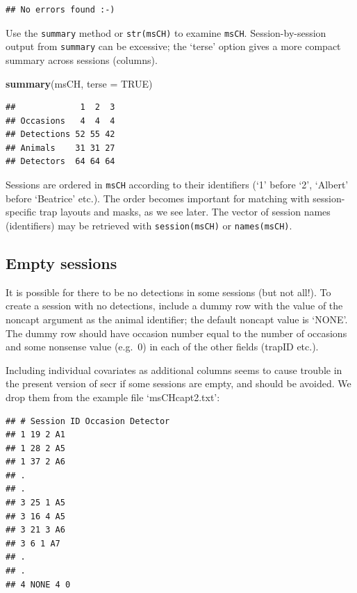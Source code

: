 \documentclass[
]{book}
\newenvironment{Shaded}{\begin{snugshade}}{\end{snugshade}}
\newcommand{\AttributeTok}[1]{\textcolor[rgb]{0.13,0.29,0.53}{#1}}
\newcommand{\ConstantTok}[1]{\textcolor[rgb]{0.56,0.35,0.01}{#1}}
\newcommand{\FunctionTok}[1]{\textcolor[rgb]{0.13,0.29,0.53}{\textbf{#1}}}
\newcommand{\NormalTok}[1]{#1}
\begin{document}
\begin{verbatim}
## No errors found :-)
\end{verbatim}

Use the \texttt{summary} method or \texttt{str(msCH)} to examine \texttt{msCH}. Session-by-session output from \texttt{summary} can be excessive; the `terse' option gives a more compact summary across sessions (columns).

\begin{Shaded}
\begin{Highlighting}[]
\FunctionTok{summary}\NormalTok{(msCH, }\AttributeTok{terse =} \ConstantTok{TRUE}\NormalTok{)}
\end{Highlighting}
\end{Shaded}

\begin{verbatim}
##             1  2  3
## Occasions   4  4  4
## Detections 52 55 42
## Animals    31 31 27
## Detectors  64 64 64
\end{verbatim}

Sessions are ordered in \texttt{msCH} according to their identifiers (`1' before `2', `Albert' before `Beatrice' etc.). The order becomes important for matching with session-specific trap layouts and masks, as we see later. The vector of session names (identifiers) may be retrieved with \texttt{session(msCH)} or \texttt{names(msCH)}.

\subsection{Empty sessions}\label{empty-sessions}

It is possible for there to be no detections in some sessions (but not all!). To create a session with no detections, include a dummy row with the value of the noncapt argument as the animal identifier; the default noncapt value is `NONE'. The dummy row should have occasion number equal to the number of occasions and some nonsense value (e.g.~0) in each of the other fields (trapID etc.).

Including individual covariates as additional columns seems to cause trouble in the present version of secr if some sessions are empty, and should be avoided. We drop them from the example file `msCHcapt2.txt':

\begin{verbatim}
## # Session ID Occasion Detector
## 1 19 2 A1
## 1 28 2 A5
## 1 37 2 A6
## .
## .
## 3 25 1 A5
## 3 16 4 A5
## 3 21 3 A6
## 3 6 1 A7
## .
## .
## 4 NONE 4 0
\end{verbatim}
\end{document}
